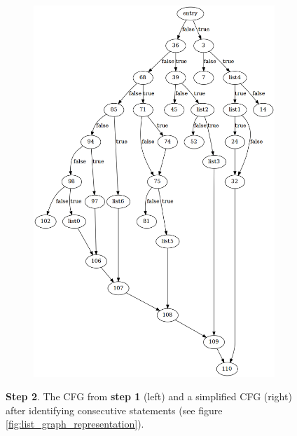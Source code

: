 \begin{figure}[htbp]
\begin{subfigure}[ht]{0.45\textwidth}
		\includegraphics[width=\textwidth]{inc/appendices/control_flow_analysis_example/stmt_2.png}
	\end{subfigure}
	\caption{\textbf{Step 2}. The CFG from \textbf{step 1} (left) and a simplified CFG (right) after identifying consecutive statements (see figure \ref{fig:list_graph_representation}).}
	\label{fig:step_2}
\end{figure}

